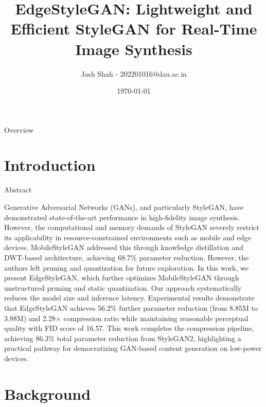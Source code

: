 \documentclass[aspectratio=169,xcolor=dvipsnames]{beamer}
\title{EdgeStyleGAN: Lightweight and Efficient StyleGAN for Real-Time Image Synthesis}
\author{Jash Shah - 202201016@dau.ac.in}
\institute
{
    Dhirubhai Ambani University
}
\date{\today}
\begin{document}
\begin{frame}
    \titlepage
\end{frame}

\begin{frame}{Overview}
    \tableofcontents
\end{frame}

\section{Introduction}

\begin{frame}{Abstract}
    \begin{itemize}
        Generative Adversarial Networks (GANs), and particularly StyleGAN, have demonstrated state-of-the-art performance in high-fidelity image synthesis. However, the computational and memory demands of StyleGAN severely restrict its applicability in resource-constrained environments such as mobile and edge devices. MobileStyleGAN addressed this through knowledge distillation and DWT-based architecture, achieving 68.7\% parameter reduction. However, the authors left pruning and quantization for future exploration. In this work, we present EdgeStyleGAN, which further optimizes MobileStyleGAN through unstructured pruning and static quantization. Our approach systematically reduces the model size and inference latency. Experimental results demonstrate that EdgeStyleGAN achieves 56.2\% further parameter reduction (from 8.85M to 3.88M) and 2.28$\times$ compression ratio while maintaining reasonable perceptual quality with FID score of 16.57. This work completes the compression pipeline, achieving 86.3\% total parameter reduction from StyleGAN2, highlighting a practical pathway for democratizing GAN-based content generation on low-power devices.
    \end{itemize}
\end{frame}

\section{Background}
\end{document}

